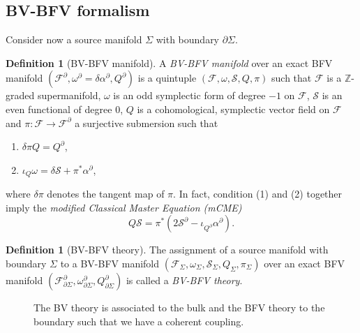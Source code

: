 \documentclass[11pt,colorinlistoftodos]{amsart}
\numberwithin{equation}{subsection}
\theoremstyle{plain}
\theoremstyle{definition}
\newtheorem{defn}[thm]{Definition}
\theoremstyle{remark}
\newcommand{\Z}{\mathbb{Z}}
\newcommand{\de}{\partial}
\newcommand{\calS}{\mathcal{S}}
\newcommand{\calF}{\mathcal{F}}
\begin{document}
\subsection{BV-BFV formalism}
\label{subsec:BV-BFV_formalism}
Consider now a source manifold $\Sigma$ with boundary $\de\Sigma$. 
\begin{defn}[BV-BFV manifold]
A \emph{BV-BFV manifold} over an exact BFV manifold $(\calF^\de,\omega^\de=\delta\alpha^\de,Q^\de)$ is a quintuple $(\calF,\omega,\calS,Q,\pi)$ such that $\calF$ is a $\Z$-graded supermanifold, $\omega$ is an odd symplectic form of degree $-1$ on $\calF$, $\calS$ is an even functional of degree 0, $Q$ is a cohomological, symplectic vector field on $\calF$ and $\pi\colon \calF\to \calF^\de$ a surjective submersion such that 
\begin{enumerate}
    \item $\delta\pi Q=Q^\de$,
    \item $\iota_Q\omega=\delta\calS+\pi^*\alpha^\de$,
\end{enumerate}
where $\delta\pi$ denotes the tangent map of $\pi$. In fact, condition (1) and (2) together imply the \emph{modified Classical Master Equation (mCME)}
\begin{equation}
    \label{eq:mCME}
    Q\calS=\pi^*(2\calS^\de-\iota_{Q^\de}\alpha^\de).
\end{equation}
\end{defn}

\begin{defn}[BV-BFV theory]
The assignment of a source manifold with boundary $\Sigma$ to a BV-BFV manifold $(\calF_\Sigma,\omega_\Sigma,\calS_\Sigma,Q_\Sigma,\pi_\Sigma)$ over an exact BFV manifold $(\calF^\de_{\de\Sigma},\omega^\de_{\de\Sigma},Q^\de_{\de\Sigma})$ is called a \emph{BV-BFV theory}.
\end{defn}

\begin{figure}[h!]
    \centering
    \caption{The BV theory is associated to the bulk and the BFV theory to the boundary such that we have a coherent coupling.}
    \label{fig:gluing_2}
\end{figure}
\end{document}
